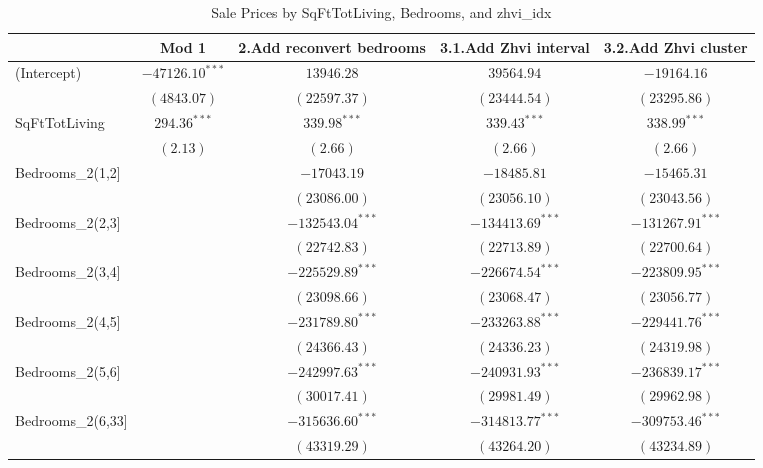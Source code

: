 \documentclass[12pt,a4paper]{article}
\begin{document}
\begin{table}[H] \centering
	\caption{Sale Prices by SqFtTotLiving, Bedrooms, and zhvi\_idx} 
	\label{}
	\begin{adjustbox}{width=1\textwidth}
	\begin{tabular}{l c c c c}
			\hline
			& Mod 1 & 2.Add reconvert bedrooms & 3.1.Add Zhvi interval & 3.2.Add Zhvi cluster \\
			\hline
			(Intercept)             & $-47126.10^{***}$ & $13946.28$         & $39564.94$         & $-19164.16$        \\
			& $(4843.07)$       & $(22597.37)$       & $(23444.54)$       & $(23295.86)$       \\
			SqFtTotLiving           & $294.36^{***}$    & $339.98^{***}$     & $339.43^{***}$     & $338.99^{***}$     \\
			& $(2.13)$          & $(2.66)$           & $(2.66)$           & $(2.66)$           \\
			Bedrooms\_2(1,2]        &                   & $-17043.19$        & $-18485.81$        & $-15465.31$        \\
			&                   & $(23086.00)$       & $(23056.10)$       & $(23043.56)$       \\
			Bedrooms\_2(2,3]        &                   & $-132543.04^{***}$ & $-134413.69^{***}$ & $-131267.91^{***}$ \\
			&                   & $(22742.83)$       & $(22713.89)$       & $(22700.64)$       \\
			Bedrooms\_2(3,4]        &                   & $-225529.89^{***}$ & $-226674.54^{***}$ & $-223809.95^{***}$ \\
			&                   & $(23098.66)$       & $(23068.47)$       & $(23056.77)$       \\
			Bedrooms\_2(4,5]        &                   & $-231789.80^{***}$ & $-233263.88^{***}$ & $-229441.76^{***}$ \\
			&                   & $(24366.43)$       & $(24336.23)$       & $(24319.98)$       \\
			Bedrooms\_2(5,6]        &                   & $-242997.63^{***}$ & $-240931.93^{***}$ & $-236839.17^{***}$ \\
			&                   & $(30017.41)$       & $(29981.49)$       & $(29962.98)$       \\
			Bedrooms\_2(6,33]       &                   & $-315636.60^{***}$ & $-314813.77^{***}$ & $-309753.46^{***}$ \\
			&                   & $(43319.29)$       & $(43264.20)$       & $(43234.89)$       \\

\end{tabular}
\end{adjustbox}
\end{table}
\end{document}
